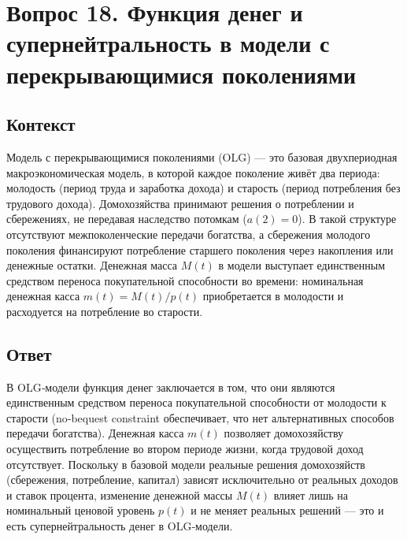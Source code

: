 \section*{Вопрос 18. Функция денег и супернейтральность в модели с перекрывающимися поколениями}

\subsection*{Контекст}
Модель с перекрывающимися поколениями (OLG) — это базовая двухпериодная макроэкономическая модель, в которой каждое поколение живёт 
два периода: молодость (период труда и заработка дохода) и старость (период потребления без трудового дохода). 
Домохозяйства принимают решения о потреблении и сбережениях, не передавая наследство потомкам (\(a(2)=0\)). В 
такой структуре отсутствуют межпоколенческие передачи богатства, а сбережения молодого поколения финансируют потребление старшего 
поколения через накопления или денежные остатки. Денежная масса \(M(t)\) в модели выступает единственным средством переноса 
покупательной способности во времени: номинальная денежная касса \(m(t)=M(t)/p(t)\) приобретается в молодости и расходуется 
на потребление во старости.


\subsection*{Ответ}
В OLG‑модели функция денег заключается в том, что они являются единственным средством переноса покупательной способности от
 молодости к старости (no‑bequest constraint обеспечивает, что нет альтернативных способов передачи богатства). 
 Денежная касса \(m(t)\) позволяет домохозяйству осуществить потребление во втором периоде жизни, когда трудовой 
 доход отсутствует. Поскольку в базовой модели реальные решения домохозяйств (сбережения, потребление, капитал) 
 зависят исключительно от реальных доходов и ставок процента, изменение денежной массы \(M(t)\) влияет лишь на
  номинальный ценовой уровень \(p(t)\) и не меняет реальных решений — это и есть супернейтральность денег в
   OLG‑модели.


